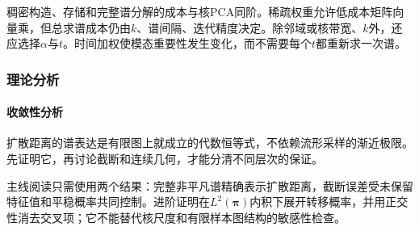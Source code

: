 稠密构造、存储和完整谱分解的成本与核PCA同阶。稀疏权重允许低成本矩阵向量乘，但总求谱成本仍由$k$、谱间隔、迭代精度决定。除邻域或核带宽、$k$外，还应选择$\alpha$与$t$。时间加权使模态重要性发生变化，而不需要每个$t$都重新求一次谱。

\subsubsection{理论分析}
\label{sec:dim-diffusion-theory}

\paragraph{收敛性分析}

扩散距离的谱表达是有限图上就成立的代数恒等式，不依赖流形采样的渐近极限。先证明它，再讨论截断和连续几何，才能分清不同层次的保证。

主线阅读只需使用两个结果：完整非平凡谱精确表示扩散距离，截断误差受未保留特征值和平稳概率共同控制。进阶证明在$L^2(\bm{\pi})$内积下展开转移概率，并用正交性消去交叉项；它不能替代核尺度和有限样本图结构的敏感性检查。

